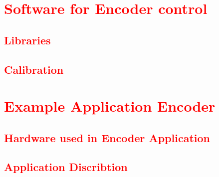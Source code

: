 \section{\textcolor{red}{Software for Encoder control}}
\subsection{\textcolor{red}{Libraries}}
\subsection{\textcolor{red}{Calibration}}

\section{\textcolor{red}{Example Application Encoder}}
\subsection{\textcolor{red}{Hardware used in Encoder Application}}
\subsection{\textcolor{red}{Application Discribtion}}

